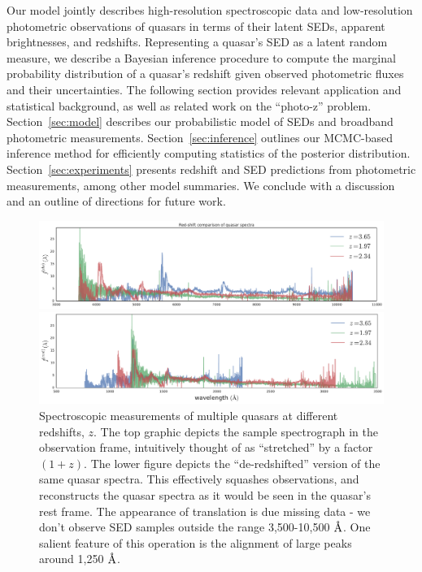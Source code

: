 \documentclass{article}
\newcommand{\angstrom}{\textup{\AA}}
\begin{document}
Our model jointly describes high-resolution spectroscopic data and low-resolution photometric observations of quasars in terms of their latent SEDs, apparent brightnesses, and redshifts. 
Representing a quasar's SED as a latent random measure, we describe a Bayesian inference procedure to compute the marginal probability distribution of a quasar's redshift given observed photometric fluxes and their uncertainties.  
The following section provides relevant application and statistical background, as well as related work on the ``photo-z'' problem.
Section~\ref{sec:model} describes our probabilistic model of SEDs and broadband photometric measurements.
Section~\ref{sec:inference} outlines our MCMC-based inference method for efficiently computing statistics of the posterior distribution.
Section~\ref{sec:experiments} presents redshift and SED predictions from photometric measurements, among other model summaries.
We conclude with a discussion and an outline of directions for future work.  

\begin{figure}[ht]
\vskip 0in
\begin{center}
\centerline{\includegraphics[width=2.1\columnwidth]{../figs/quasar_redshift_obs_frame}}
\centerline{\includegraphics[width=2.1\columnwidth]{../figs/quasar_redshift_rest_frame}}
\vskip -0.18in
\caption{%
Spectroscopic measurements of multiple quasars at different redshifts, $z$.
The top graphic depicts the sample spectrograph in the observation frame, intuitively thought of as ``stretched'' by a factor $(1+z)$.
The lower figure depicts the ``de-redshifted'' version of the same quasar spectra.
This effectively squashes observations, and reconstructs the quasar spectra as it would be seen in the quasar's rest frame.  
The appearance of translation is due missing data - we don't observe SED samples outside the range 3,500-10,500 $\angstrom$.   
One salient feature of this operation is the alignment of large peaks around 1,250 $\angstrom$. }
\label{fig:frames}
\end{center}
\vskip -0.28in
\end{figure} 
\end{document}
